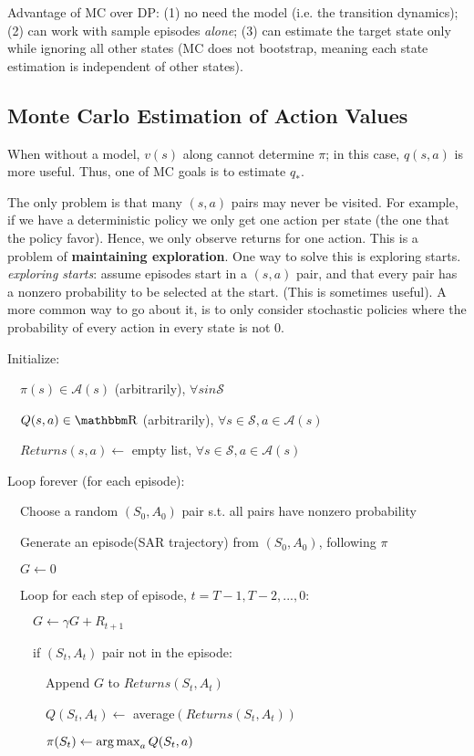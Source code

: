 \documentclass[sutton_barto_notes.tex]{subfiles}
\begin{document}
Advantage of MC over DP: (1) no need the model (i.e. the transition dynamics); (2) can work with sample episodes \textit{alone}; (3) can estimate the target state only while ignoring all other states (MC does not bootstrap, meaning each state estimation is independent of other states).

\subsection{Monte Carlo Estimation of Action Values}

When without a model, $v(s)$ along cannot determine $\pi$; in this case, $q(s,a)$ is more useful. Thus, one of MC goals is to estimate $q_*$.

The only problem is that many $(s,a)$ pairs may never be visited. For example, if we have a deterministic policy we only get one action per state (the one that the policy favor). Hence, we only observe returns for one action. This is a problem of \textbf{maintaining exploration}.
One way to solve this is exploring starts.
\textit{exploring starts}: assume episodes start in a $(s,a)$ pair, and that every pair has a nonzero probability to be selected at the start. (This is sometimes useful). A more common way to go about it, is to only consider stochastic policies where the probability of every action in every state is not 0.

\begin{tcolorbox}[width=1.1\textwidth,title={MC Exploring Starts, for estimating $V \approx v_\pi$}]
Initialize:

$\quad \pi(s) \in \mathcal{A}(s)$ (arbitrarily), $\forall s in \mathcal{S}$

$\quad Q(s,a) \in \R$ (arbitrarily), $\forall s \in \mathcal{S}, a \in \mathcal{A}(s)$

$\quad Returns(s,a) \leftarrow$ empty list, $\forall s \in \mathcal{S}, a \in \mathcal{A}(s)$

Loop forever (for each episode):

$\quad$Choose a random $(S_0, A_0)$ pair s.t. all pairs have nonzero probability

$\quad$Generate an episode(SAR trajectory) from $(S_0, A_0)$, following $\pi$

$\quad G \leftarrow 0$

$\quad$Loop for each step of episode, $t = T-1, T-2, ..., 0$:

$\quad\quad G\leftarrow \gamma G + R_{t+1}$

$\quad\quad$if $(S_t, A_t)$ pair not in the episode:

$\quad\quad\quad$Append $G$ to $Returns(S_t, A_t)$

$\quad\quad\quad Q(S_t, A_t) \leftarrow$ average$(Returns(S_t, A_t))$

$\quad\quad\quad \pi(S_t) \leftarrow \operatorname*{arg\,max}_a Q(S_t, a)$

\end{tcolorbox}
\end{document}
